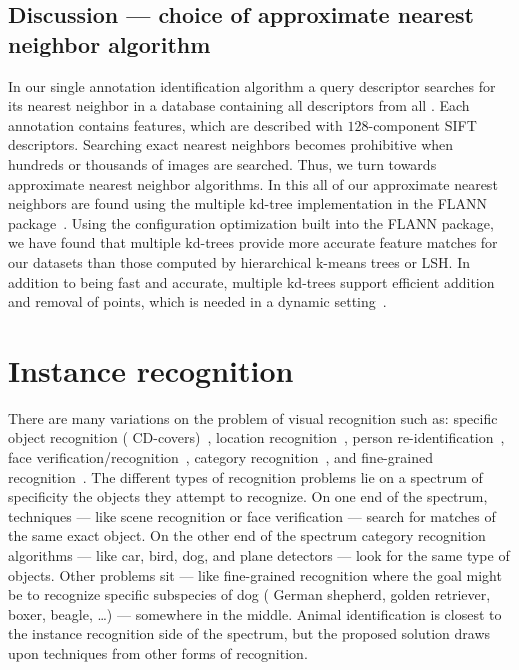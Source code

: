     \subsection{Discussion --- choice of approximate nearest neighbor algorithm}
        In our single annotation identification algorithm a query descriptor searches for its nearest neighbor in a
        database containing all descriptors from all \exemplars{}. Each annotation contains 
        features, which are described with $128$-component SIFT descriptors. Searching exact nearest neighbors
        becomes prohibitive when hundreds or thousands of images are searched. Thus, we turn towards approximate
        nearest neighbor algorithms. In this \thesis{} all of our approximate nearest neighbors are found using the
        multiple kd-tree implementation in the FLANN package~\cite{muja_fast_2009}. Using the configuration
        optimization built into the FLANN package, we have found that multiple kd-trees provide more accurate
        feature matches for our datasets than those computed by hierarchical k-means trees or LSH{}. In addition to
        being fast and accurate, multiple kd-trees support efficient addition and removal of points, which is
        needed in a dynamic setting~\cite{silpa_anan_optimised_2008}.


\section{Instance recognition}\label{sec:ir}
    There are many variations on the problem of visual recognition such as: specific object recognition (\eg{}
    CD-covers)~\cite{lowe_distinctive_2004, sivic_efficient_2009, nister_scalable_2006},
    location recognition~\cite{jegou_hamming_2008,jegou_aggregating_2012,tolias_aggregate_2013},
    person re-identification~\cite{shi_embedding_2016,karanam_person_2015,wu_viewpoint_2015},
    face verification/recognition~\cite{chopra_learning_2005, huang_labeled_2007, berg_tom_vs_pete_2012,
    chen_blessing_2013, taigman_deepface_2014, schroff_facenet_2015},
    category recognition~\cite{lazebnik_beyond_2006,zhang_local_2006,mccann_local_2012,boiman_defense_2008},
    and fine-grained recognition~\cite{parkhi_cats_2012,berg_poof_2013, gavves_local_2014}.
    The different types of recognition problems lie on a spectrum of specificity \wrt{} the objects they attempt to
    recognize. On one end of the spectrum,  techniques --- like scene recognition
    or face verification --- search for matches of the same exact object. On the other end of the spectrum category
    recognition algorithms --- like car, bird, dog, and plane detectors --- look for the same type of objects.
    Other problems sit --- like fine-grained recognition where the goal might be to recognize specific subspecies
    of dog (\eg{} German shepherd, golden retriever, boxer, beagle, \ldots{}) --- somewhere in the middle. Animal
    identification is closest to the instance recognition side of the spectrum, but the proposed solution draws
    upon techniques from other forms of recognition.

